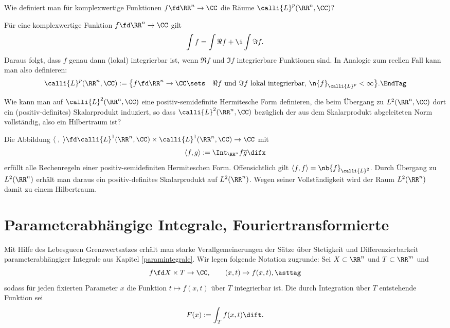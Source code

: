 \begin{frage}
  Wie definiert man für komplexwertige Funktionen $f\fd\RR^n\to\CC$ 
  die Räume $\calli{L}^p( \RR^n, \CC)$? 
\end{frage}

\begin{antwort}
  Für eine komplexwertige Funktion $f\fd\RR^n \to \CC$ gilt 
  \[
  \int f = \int \Re f + \i \int \Im f.
  \]
  Daraus folgt, dass $f$ genau dann (lokal) 
  integrierbar ist, wenn $\Re f$ und $\Im f$ integrierbare Funktionen sind. 
  In Analogie zum reellen Fall kann man also definieren:
  \[
  \calli{L}^p (\RR^n,\CC):= \big\{ f\fd \RR^n \to\CC \sets \quad 
  \text{$\Re f$ und $\Im f$ lokal integrierbar},\, 
  \n{f}_{\calli{L}^p} <\infty \big\}. \EndTag
  \]
\end{antwort} 

\begin{frage}\label{11_l2}
  Wie kann man auf $\calli{L}^2( \RR^n,\CC)$ eine positiv-semidefinite 
  Hermitesche Form definieren, die beim Übergang zu $L^2(\RR^n,\CC)$ 
  dort ein (positiv-definites) Skalarprodukt induziert, so dass 
  $\calli{L}^2(\RR^n,\CC)$ bezüglich der aus dem Skalarprodukt abgeleiteten 
  Norm vollständig, also ein Hilbertraum ist?
\end{frage}

\begin{antwort}
  Die Abbildung 
  $\langle\;,\;\rangle \fd \calli{L}^1(\RR^n,\CC) \times 
  \calli{L}^1(\RR^n,\CC)  \to \CC$ mit 
  \[
  \langle f,g \rangle := \Int_{\RR^n} f\overline{g} \difx 
  \]
  erfüllt alle Rechenregeln einer positiv-semidefiniten Hermiteschen Form. 
  Offensichtlich gilt $\langle f,f \rangle = \nb{f}_{\calli{L}^2}$. Durch 
  Übergang zu $L^2(\RR^n)$ erhält man daraus ein positiv-definites 
  Skalarprodukt auf $L^2(\RR^n)$. Wegen seiner Vollständigkeit wird der 
  Raum $L^2(\RR^n)$ damit zu einem Hilbertraum.\AntEnd 
\end{antwort} 

\section{Parameterabhängige Integrale, Fouriertransformierte}

Mit Hilfe des Lebesgue\sch en Grenzwertsatzes erhält man starke 
Verallgemeinerungen der Sätze über Stetigkeit und Differenzierbarkeit 
parameterabhängiger Integrale aus Kapitel \ref{paramintegrale}. 
Wir legen folgende Notation zugrunde: Sei 
$X\subset \RR^n$ und $T \subset \RR^m$ und 
\[
f\fd X \times T \to\CC, \qquad 
(x,t) \mapsto f(x,t),
\asttag
\]
sodass für jeden fixierten Parameter $x$ die Funktion 
$t\mapsto f(x,t)$ über $T$ integrierbar ist. Die durch 
Integration über $T$ entstehende Funktion sei
\[
F(x) := \int_{T} f(x,t) \dift.
\]


